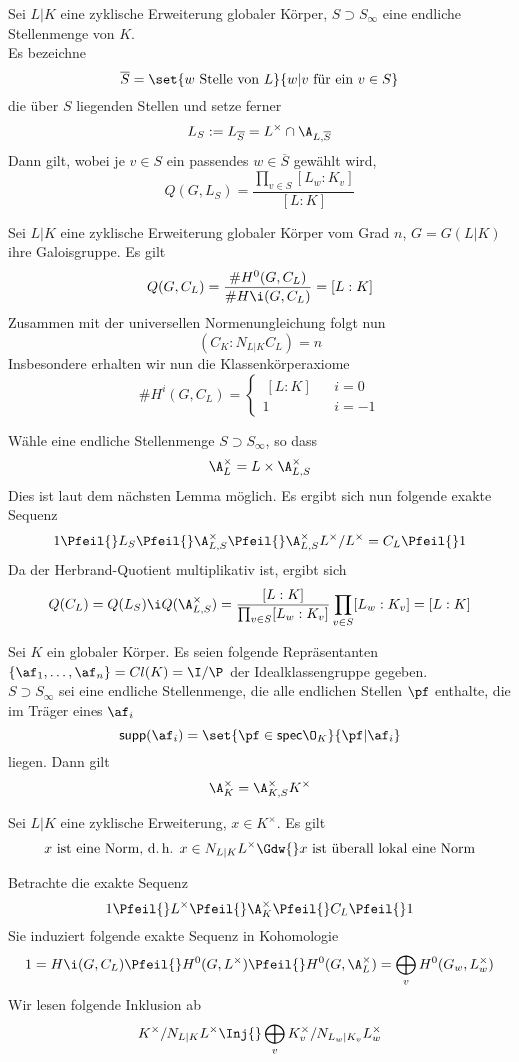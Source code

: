 \Satz{}
Sei $L|K$ eine zyklische Erweiterung globaler Körper, $S \supset S_\infty$ eine endliche Stellenmenge von $K$.\\
Es bezeichne 
\[\overline{S} = \set{w \text{ Stelle von }L}{w|v \text{ für ein } v \in S} \]
die über $S$ liegenden Stellen und setze ferner
\[ L_S := L_{\overline{S}} = L^\times \cap \A_{L,\overline{S}} \]
Dann gilt, wobei je $v \in S$ ein passendes $w\in \overline{S}$ gewählt wird,
\[ Q(G,L_S) = \frac{\prod_{v\in S} [L_w : K_v]}{[L:K]} \]

\Satz{}
Sei $L|K$ eine zyklische Erweiterung globaler Körper vom Grad $n$, $G = G(L|K)$ ihre Galoisgruppe. Es gilt
\[ Q(G, C_L) = \frac{\# H^0(G,C_L)}{\# H\i(G,C_L)} = [L:K]  \]
Zusammen mit der universellen Normenungleichung  folgt nun
\[ (C_K : N_{L|K} C_L ) = n \]
Insbesondere erhalten wir nun die Klassenkörperaxiome
\[ \# H^i(G,C_L) = \left\lbrace
\begin{aligned}
\ [L:K] && i = 0\\
1 && i = -1
\end{aligned}
\right. \]

\begin{Beweis}{}
Wähle eine endliche Stellenmenge $S \supset S_\infty$, so dass
\[ \A_L^\times = L\times \A_{L,S}^\times \]
Dies ist laut dem nächsten Lemma möglich. Es ergibt sich nun folgende exakte Sequenz
\[ 1 \Pfeil{} L_S \Pfeil{} \A_{L,S}^\times \Pfeil{} \A_{L,S}^\times L^\times /L^\times = C_L \Pfeil{} 1 \]
Da der Herbrand-Quotient multiplikativ ist, ergibt sich
\[ Q(C_L) = Q(L_S)\i Q(\A_{L,S}^\times) = \frac{[L:K]}{\prod_{v\in S} [L_w : K_v]} \prod_{v\in S} [L_w : K_v] = [L:K] \]
\end{Beweis}

\Lem{}
Sei $K$ ein globaler Körper. Es seien folgende Repräsentanten $\{\af_1,\ldots , \af_n \} = Cl(K) = \I / \P$ der Idealklassengruppe gegeben.\\
$S \supset S_\infty$ sei eine endliche Stellenmenge, die alle endlichen Stellen $\pf$ enthalte, die im Träger eines $\af_i$
\[ \textsf{supp}(\af_i) = \set{\pf \in \textsf{spec}\O_K}{\pf | \af_i} \]
liegen. Dann gilt
\[ \A_K^\times = \A_{K,S}^\times K^\times \]

Sei $L|K$ eine zyklische Erweiterung, $x \in K^\times$. Es gilt
\[ x \text{ ist eine Norm, d.\,h. } x \in N_{L|K}L^\times \Gdw{} x \text{ ist überall lokal eine Norm} \]
\begin{Beweis}{}
Betrachte die exakte Sequenz
\[ 1 \Pfeil{} L^\times \Pfeil{} \A_K^\times \Pfeil{} C_L \Pfeil{} 1 \]
Sie induziert folgende exakte Sequenz in Kohomologie
\[ 1 = H\i(G,C_L) \Pfeil{} H^0(G,L^\times) \Pfeil{} H^0(G,\A_L^\times) = \bigoplus_v H^0(G_w, L_w^\times) \]
Wir lesen folgende Inklusion ab
\[ K^\times / N_{L|K}L^\times \Inj{} \bigoplus_v K_v^\times / N_{L_w|K_v}L_w^\times \]
\end{Beweis}